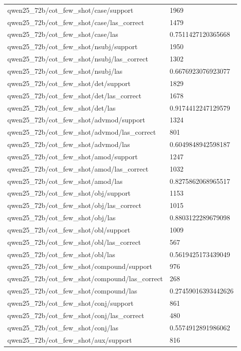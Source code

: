 \begin{tabular}{ll}
qwen25\_72b/cot\_few\_shot/case/support & 1969 \\
qwen25\_72b/cot\_few\_shot/case/las\_correct & 1479 \\
qwen25\_72b/cot\_few\_shot/case/las & 0.7511427120365668 \\
qwen25\_72b/cot\_few\_shot/nsubj/support & 1950 \\
qwen25\_72b/cot\_few\_shot/nsubj/las\_correct & 1302 \\
qwen25\_72b/cot\_few\_shot/nsubj/las & 0.6676923076923077 \\
qwen25\_72b/cot\_few\_shot/det/support & 1829 \\
qwen25\_72b/cot\_few\_shot/det/las\_correct & 1678 \\
qwen25\_72b/cot\_few\_shot/det/las & 0.9174412247129579 \\
qwen25\_72b/cot\_few\_shot/advmod/support & 1324 \\
qwen25\_72b/cot\_few\_shot/advmod/las\_correct & 801 \\
qwen25\_72b/cot\_few\_shot/advmod/las & 0.6049848942598187 \\
qwen25\_72b/cot\_few\_shot/amod/support & 1247 \\
qwen25\_72b/cot\_few\_shot/amod/las\_correct & 1032 \\
qwen25\_72b/cot\_few\_shot/amod/las & 0.8275862068965517 \\
qwen25\_72b/cot\_few\_shot/obj/support & 1153 \\
qwen25\_72b/cot\_few\_shot/obj/las\_correct & 1015 \\
qwen25\_72b/cot\_few\_shot/obj/las & 0.8803122289679098 \\
qwen25\_72b/cot\_few\_shot/obl/support & 1009 \\
qwen25\_72b/cot\_few\_shot/obl/las\_correct & 567 \\
qwen25\_72b/cot\_few\_shot/obl/las & 0.5619425173439049 \\
qwen25\_72b/cot\_few\_shot/compound/support & 976 \\
qwen25\_72b/cot\_few\_shot/compound/las\_correct & 268 \\
qwen25\_72b/cot\_few\_shot/compound/las & 0.27459016393442626 \\
qwen25\_72b/cot\_few\_shot/conj/support & 861 \\
qwen25\_72b/cot\_few\_shot/conj/las\_correct & 480 \\
qwen25\_72b/cot\_few\_shot/conj/las & 0.5574912891986062 \\
qwen25\_72b/cot\_few\_shot/aux/support & 816 \\

\end{tabular}
